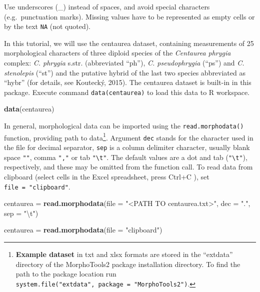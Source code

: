 \documentclass[
]{article}
\newenvironment{Shaded}{\begin{snugshade}}{\end{snugshade}}
\newcommand{\CharTok}[1]{\textcolor[rgb]{0.31,0.60,0.02}{#1}}
\newcommand{\DataTypeTok}[1]{\textcolor[rgb]{0.13,0.29,0.53}{#1}}
\newcommand{\KeywordTok}[1]{\textcolor[rgb]{0.13,0.29,0.53}{\textbf{#1}}}
\newcommand{\NormalTok}[1]{#1}
\newcommand{\StringTok}[1]{\textcolor[rgb]{0.31,0.60,0.02}{#1}}
\begin{document}
Use underscores (\_) instead of spaces, and avoid special characters
(e.g.~punctuation marks). Missing values have to be represented as empty
cells or by the text \texttt{NA} (not quoted).

In this tutorial, we will use the centaurea dataset, containing
measurements of 25 morphological characters of three diploid species of
the \emph{Centaurea phrygia} complex: \emph{C. phrygia} s.str.
(abbreviated ``ph''), \emph{C. pseudophrygia} (``ps'') and \emph{C.
stenolepis} (``st'') and the putative hybrid of the last two species
abbreviated as ``hybr'' (for details, see Koutecký, 2015). The centaurea
dataset is built-in in this package. Execute command
\texttt{data(centaurea)} to load this data to R workspace.

\begin{Shaded}
\begin{Highlighting}[]
\KeywordTok{data}\NormalTok{(centaurea)}
\end{Highlighting}
\end{Shaded}

In general, morphological data can be imported using the
\texttt{read.morphodata()} function, providing path to data\footnote{\textbf{Example
  dataset} in txt and xlsx formats are stored in the ``extdata''
  directory of the MorphoTools2 package installation directory. To find
  the path to the package location run
  \texttt{system.file("extdata",\ package\ =\ "MorphoTools2")}.}.
Argument \texttt{dec} stands for the character used in the file for
decimal separator, \texttt{sep} is a column delimiter character, usually
blank space \texttt{""}, comma \texttt{","} or tab
\texttt{"\textbackslash{}t"}. The default values are a dot and tab
(\texttt{"\textbackslash{}t"}), respectively, and these may be omitted
from the function call. To read data from clipboard (select cells in the
Excel spreadsheet, press Ctrl+C ), set \texttt{file\ =\ "clipboard"}.

\begin{Shaded}
\begin{Highlighting}[]
\NormalTok{centaurea =}\StringTok{ }\KeywordTok{read.morphodata}\NormalTok{(}\DataTypeTok{file =} \StringTok{"<PATH TO centaurea.txt>"}\NormalTok{, }\DataTypeTok{dec =} \StringTok{"."}\NormalTok{, }\DataTypeTok{sep =} \StringTok{"}\CharTok{\textbackslash{}t}\StringTok{"}\NormalTok{)}
\end{Highlighting}
\end{Shaded}

\begin{Shaded}
\begin{Highlighting}[]
\NormalTok{centaurea =}\StringTok{ }\KeywordTok{read.morphodata}\NormalTok{(}\DataTypeTok{file =} \StringTok{"clipboard"}\NormalTok{)}
\end{Highlighting}
\end{Shaded}
\end{document}
